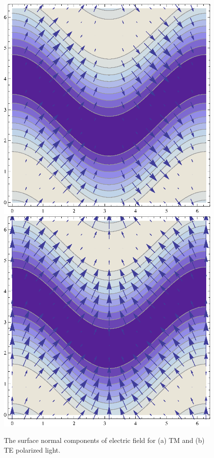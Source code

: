 \documentclass[oneside,11pt,book]{book}
\begin{document}
\begin{figure}
\begin{center}
\includegraphics[scale=0.5]{figure-TM-field-components}
\includegraphics[scale=0.5]{figure-TE-field-components}
\end{center}
\caption{The surface normal components of electric field for (a) TM and (b) TE polarized light.}
\end{figure}
\end{document}
